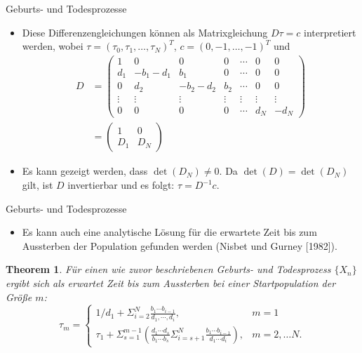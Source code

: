 \documentclass{beamer}
\newtheorem{thm}{Theorem}
\begin{document}
\begin{frame}{Geburts- und Todesprozesse}
  \begin{itemize}
    \item Diese Differenzengleichungen können als Matrixgleichung $Dτ = c$ interpretiert werden, wobei $τ =
    (τ_0,τ_1,\dots,τ_N)^T$, $c = (0,-1,\dots,-1)^T$ und
    \begin{align*}
      D &=
  \begin{pmatrix}
    1 & 0 & 0 & 0 & \cdots & 0 & 0 \\
    d_1 & -b_1-d_1 & b_1 & 0 & \cdots & 0 & 0 \\
    0 & d_2 & -b_2-d_2 & b_2 & \cdots & 0 & 0 \\
    \vdots & \vdots & \vdots & \vdots & \vdots & \vdots & \vdots \\
    0 & 0 & 0 & 0 & \cdots & d_N & -d_N 
  \end{pmatrix} \\
        &= \begin{pmatrix}
      1 & 0 \\
      D_1 & D_N
    \end{pmatrix}
    \end{align*}
  \item Es kann gezeigt werden, dass $\det(D_N) ≠ 0$. Da $\det(D) = \det(D_N)$ gilt, ist $D$ invertierbar und es folgt: $τ = D^{-1}c$.
  \end{itemize}
\end{frame}
\begin{frame}{Geburts- und Todesprozesse}
  \begin{itemize}
  \item Es kann auch eine analytische Lösung für die erwartete Zeit bis zum Aussterben der Population gefunden werden (Nisbet und Gurney [1982]).
  \end{itemize}
  \begin{thm}
    Für einen wie zuvor beschriebenen Geburts- und Todesprozess $\{X_n\}$ ergibt sich als erwartet Zeit bis zum Aussterben bei einer Startpopulation der Größe $m$:
    \[
      τ_m = \begin{cases}
        1/d_1 + Σ_{i=2}^N \frac{b_1\cdots b_{i-1}}{d_1, \cdots, d_i}, &m = 1 \\
        τ_1 + Σ_{s=1}^{m-1}\left(\frac{d_1\cdots d_s}{b_1\cdots b_s} Σ_{i = s+1}^N \frac{b_1\cdots b_{i-1}}{d_1\cdots d_i}\right), &m = 2, \dots N.
      \end{cases}
    \]
  \end{thm}
\end{frame}
\end{document}
